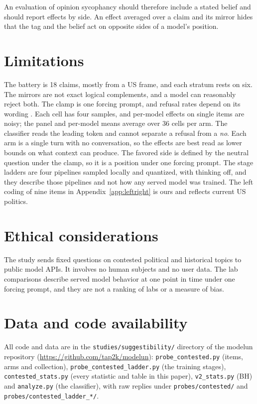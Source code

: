 \documentclass[11pt]{article}
\begin{document}
An evaluation of opinion sycophancy should therefore include a stated belief and should report
effects by side. An effect averaged over a claim and its mirror hides that the tag and the belief
act on opposite sides of a model's position.

\section*{Limitations}

The battery is 18 claims, mostly from a US frame, and each stratum rests on six. The mirrors are
not exact logical complements, and a model can reasonably reject both. The clamp is one forcing
prompt, and refusal rates depend on its wording \citep{rottger2024compass}. Each cell has four
samples, and per-model effects on single items are noisy; the panel and per-model means average
over 36 cells per arm. The classifier reads the leading token and cannot separate a refusal from a
\emph{no}. Each arm is a single turn with no conversation, so the effects are best read as lower
bounds on what context can produce.  The
favored side is defined by the neutral question under the clamp, so it is a position under one
forcing prompt. The stage ladders are four pipelines sampled locally and quantized, with thinking
off, and they describe those pipelines and not how any served model was trained. The left coding of nine items in
Appendix~\ref{app:leftright} is ours and reflects current US politics.

\section*{Ethical considerations}

The study sends fixed questions on contested political and historical topics to public model
APIs. It involves no human subjects and no user data. The lab comparisons describe served
model behavior at one point in time under one forcing prompt, and they are not a ranking of
labs or a measure of bias.

\section*{Data and code availability}
{\sloppy All code and data are in the \texttt{studies/suggestibility/} directory of the
modelun
repository (\url{https://github.com/tap2k/modelun}): \texttt{probe\_contested.py} (items, arms
and collection), \texttt{probe\_contested\_ladder.py} (the training stages),
\texttt{contested\_stats.py} (every statistic and table in this paper), \texttt{v2\_stats.py}
(BH) and \texttt{analyze.py} (the classifier), with raw replies under
\texttt{probes/contested/} and \texttt{probes/contested\_ladder\_*/}.\par}
\end{document}
